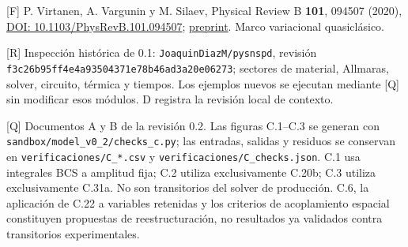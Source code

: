 \documentclass[
  spanish,
  10pt,
  a4paper,
]{article}
\begin{document}
{[}F{]} P. Virtanen, A. Vargunin y M. Silaev, Physical Review B
\textbf{101}, 094507 (2020),
\href{https://doi.org/10.1103/PhysRevB.101.094507}{DOI:
10.1103/PhysRevB.101.094507};
\href{https://arxiv.org/abs/1909.00992}{preprint}. Marco variacional
quasiclásico.

{[}R{]} Inspección histórica de 0.1: \nolinkurl{JoaquinDiazM/pysnspd},
revisión \nolinkurl{f3c26b95ff4e4a93504371e78b46ad3a20e06273}; sectores de
material, Allmaras, solver, circuito, térmica y tiempos. Los ejemplos
nuevos se ejecutan mediante {[}Q{]} sin modificar esos módulos. D
registra la revisión local de contexto.

{[}Q{]} Documentos A y B de la revisión 0.2. Las figuras C.1--C.3 se
generan con \nolinkurl{sandbox/model_v0_2/checks_c.py}; las entradas,
salidas y residuos se conservan en \nolinkurl{verificaciones/C_*.csv} y
\nolinkurl{verificaciones/C_checks.json}. C.1 usa integrales BCS a
amplitud fija; C.2 utiliza exclusivamente C.20b; C.3 utiliza
exclusivamente C.31a. No son transitorios del solver de producción. C.6,
la aplicación de C.22 a variables retenidas y los criterios de
acoplamiento espacial constituyen propuestas de reestructuración, no
resultados ya validados contra transitorios experimentales.
\end{document}
